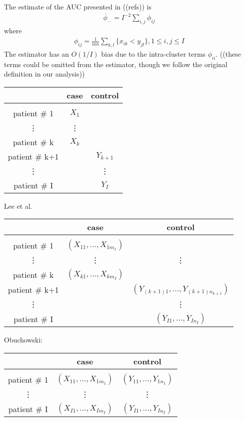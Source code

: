 \documentclass{article}
\newcommand{\I}{I}
\newcommand{\auchat}{\overline{\phi}_{\cdot \cdot}}
\begin{document}
\begin{enumerate}
  The estimate of the AUC presented in ((refs)) is
  \begin{align}
    \auchat= \I^{-2}\sum_{i,j}\phi_{ij}
  \end{align}
  where
  \begin{align}
    \phi_{ij}=\frac{1}{mn}\sum_{k,l}\{x_{ik}<y_{jl}\}, 1\le i,j \le \I
  \end{align}
  The estimator has an $O(1/\I)$ bias due to the intra-cluster terms
  $\phi_{ii}$. ((these terms could be omitted from the estimator,
  though we follow the original definition in our analysis))
  



  \begin{tabular}{c | c | c}
    & case & control\\
    \hline&&\\
    patient \# 1 & $X_1$ & \\
    \vdots & \vdots & \\
    patient \# k & $X_{k}$ &\\
      patient \# k+1 &  & $Y_{k+1}$\\
     \vdots & & \vdots\\
    patient \# \I &  & $Y_{\I}$\\
  \end{tabular}
Lee et al.
  \begin{tabular}{c | c | c}
    & case & control\\
    \hline&&\\
    patient \# 1 & $(X_{11},\ldots,X_{1m_1})$ &\\
    \vdots & \vdots & \vdots\\
    patient \# k & $(X_{k1},\ldots,X_{km_{\I}})$ & \\
    patient \# k+1 & & $(Y_{(k+1)1},\ldots,Y_{(k+1)n_{k+1}})$\\
    \vdots &  & \vdots \\
    patient \# \I & & $(Y_{\I 1},\ldots,Y_{\I n_{\I}})$\\
  \end{tabular}
Obuchowski:
  \begin{tabular}{c | c | c}
    & case & control\\
    \hline&&\\
    patient \# 1 & $(X_{11},\ldots,X_{1m_1})$ & $(Y_{11},\ldots,Y_{1n_1})$\\
    \vdots & \vdots & \vdots\\
    patient \# \I & $(X_{\I1},\ldots,X_{\I m_{\I}})$ & $(Y_{\I1},\ldots,Y_{\I n_{\I}})$\\
  \end{tabular}


\end{enumerate}
\end{document}
